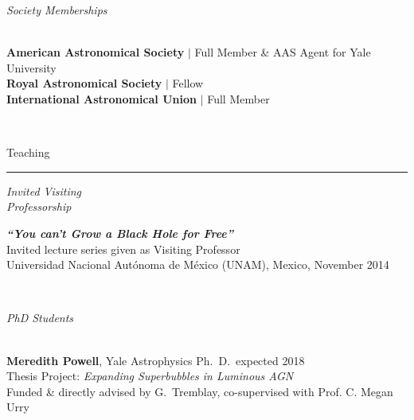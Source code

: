 \documentclass[11pt]{article}
\makeatletter
\def\vhrulefill#1{\leavevmode\leaders\hrule\@height#1\hfill \kern\z@}
\makeatother
\begin{document}
\vspace{4mm}


\hspace{2.5mm} \parbox{1.5in}{{\it Society Memberships \\\\}} \parbox{5.15in}{ \textbf{American Astronomical Society} $|$ Full Member \& AAS Agent for Yale University \\ \textbf{Royal Astronomical Society} $|$ Fellow \\ \textbf{International Astronomical Union} $|$ Full Member}\\ 




\vspace{4mm}


{\sc Teaching} \vhrulefill{0.4pt}


\vspace{6mm}


\hspace{2.5mm} \parbox{1.5in}{{\it Invited Visiting \\ Professorship \\ }} \parbox{5.15in}{ \textit{\textbf{``You can't Grow a Black Hole for Free''}}\\ Invited lecture series given as Visiting Professor \\ Universidad Nacional Aut\'{o}noma de M\'{e}xico (UNAM), Mexico, November 2014}\\

\vspace{4mm}


\hspace{2.5mm} \parbox{1.5in}{{\it PhD Students \\\\}} \parbox{5.15in}{
{\bf Meredith Powell}, Yale Astrophysics Ph.~D.~expected 2018\\ Thesis Project: {\it Expanding Superbubbles in Luminous AGN}\\
Funded \& directly advised by G.~Tremblay, 
co-supervised with Prof. C. Megan Urry
}\\



\vspace{4mm}
\end{document}
